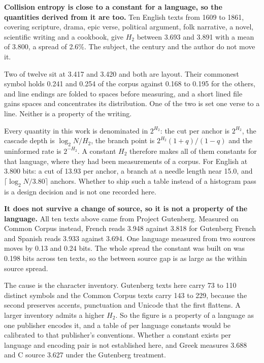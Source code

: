 \textbf{Collision entropy is close to a constant for a language, so the quantities derived from it are too.} Ten English texts from 1609 to 1861, covering scripture, drama, epic verse, political argument, folk narrative, a novel, scientific writing and a cookbook, give \(H_2\) between 3.693 and 3.891 with a mean of 3.800, a spread of 2.6\%. The subject, the century and the author do not move it.

Two of twelve sit at 3.417 and 3.420 and both are layout. Their commonest symbol holds 0.241 and 0.254 of the corpus against 0.168 to 0.195 for the others, and line endings are folded to spaces before measuring, and a short lined file gains spaces and concentrates its distribution. One of the two is set one verse to a line. Neither is a property of the writing.

Every quantity in this work is denominated in \(2^{H_2}\): the cut per anchor is \(2^{H_2}\), the cascade depth is \(\log_2 N / H_2\), the branch point is \(2^{H_2}(1+q)/(1-q)\) and the uninformed rate is \(2^{-H_2}\). A constant \(H_2\) therefore makes all of them constants for that language, where they had been measurements of a corpus. For English at 3.800 bits: a cut of 13.93 per anchor, a branch at a needle length near 15.0, and \(\lceil \log_2 N / 3.80 \rceil\) anchors. Whether to ship such a table instead of a histogram pass is a design decision and is not one recorded here.

\textbf{It does not survive a change of source, so it is not a property of the language.} All ten texts above came from Project Gutenberg. Measured on Common Corpus instead, French reads 3.948 against 3.818 for Gutenberg French and Spanish reads 3.933 against 3.694. One language measured from two sources moves by 0.13 and 0.24 bits. The whole spread the constant was built on was 0.198 bits across ten texts, so the between source gap is as large as the within source spread.

The cause is the character inventory. Gutenberg texts here carry 73 to 110 distinct symbols and the Common Corpus texts carry 143 to 229, because the second preserves accents, punctuation and Unicode that the first flattens. A larger inventory admits a higher \(H_2\). So the figure is a property of a language as one publisher encodes it, and a table of per language constants would be calibrated to that publisher's conventions. Whether a constant exists per language and encoding pair is not established here, and Greek measures 3.688 and C source 3.627 under the Gutenberg treatment.

